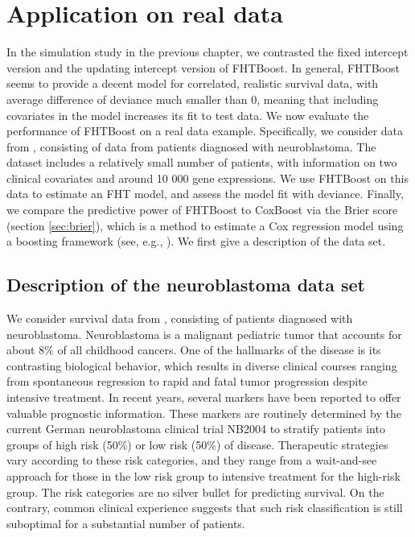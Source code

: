 \chapter{Application on real data}
In the simulation study in the previous chapter, we contrasted the fixed intercept version and the updating intercept version of FHTBoost.
In general, FHTBoost seems to provide a decent model for correlated, realistic survival data, with average difference of deviance much smaller than 0, meaning that including covariates in the model increases its fit to test data.
We now evaluate the performance of FHTBoost on a real data example.
Specifically, we consider data from \citet{oberthuer-data}, consisting of data from patients diagnosed with neuroblastoma.
The dataset includes a relatively small number of patients, with information on two clinical covariates and around 10 000 gene expressions.
We use FHTBoost on this data to estimate an FHT model, and assess the model fit with deviance.
Finally, we compare the predictive power of FHTBoost to CoxBoost via the Brier score (section \ref{sec:brier}), which is a method to estimate a Cox regression model using a boosting framework (see, e.g., \citet{BinderSchumacher2008}).
We first give a description of the data set.

\section{Description of the neuroblastoma data set}
We consider survival data from \citet{oberthuer-data}, consisting of patients diagnosed with neuroblastoma.
Neuroblastoma is a malignant pediatric tumor that accounts for about 8\% of all childhood cancers.
One of the hallmarks of the disease is its contrasting biological behavior, which results in diverse clinical courses ranging from spontaneous regression to rapid and fatal tumor progression despite intensive treatment.
In recent years, several markers have been reported to offer valuable prognostic information.
These markers are routinely determined by the current German neuroblastoma clinical trial NB2004 to stratify patients into groups of high risk (50\%) or low risk (50\%) of disease.
Therapeutic strategies vary according to these risk categories, and they range from a wait-and-see approach for those in the low risk group
to intensive treatment for the high-risk group.
The risk categories are no silver bullet for predicting survival.
On the contrary, common clinical experience suggests that such risk classification is still suboptimal for a substantial number of patients.

